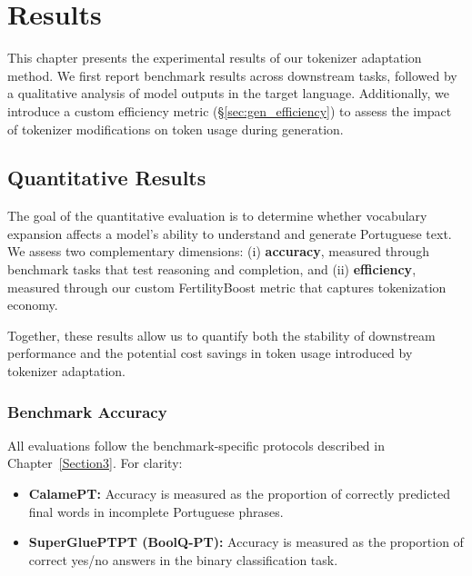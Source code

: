 
\chapter{Results}


\label{chap:results}

This chapter presents the experimental results of our tokenizer adaptation method. We first report benchmark results across downstream tasks, followed by a qualitative analysis of model outputs in the target language. Additionally, we introduce a custom efficiency metric (\S\ref{sec:gen_efficiency}) to assess the impact of tokenizer modifications on token usage during generation.


\section{Quantitative Results}

The goal of the quantitative evaluation is to determine whether vocabulary expansion affects a model’s ability to understand and generate Portuguese text. We assess two complementary dimensions:  
(i) \textbf{accuracy}, measured through benchmark tasks that test reasoning and completion, and  
(ii) \textbf{efficiency}, measured through our custom FertilityBoost metric that captures tokenization economy.  

Together, these results allow us to quantify both the stability of downstream performance and the potential cost savings in token usage introduced by tokenizer adaptation.


\subsection{Benchmark Accuracy}
All evaluations follow the benchmark-specific protocols described in Chapter~\ref{Section3}. For clarity:

\begin{itemize}
    \item \textbf{CalamePT:} Accuracy is measured as the proportion of correctly predicted final words in incomplete Portuguese phrases.
    \item \textbf{SuperGluePTPT (BoolQ-PT):} Accuracy is measured as the proportion of correct yes/no answers in the binary classification task.
\end{itemize}

